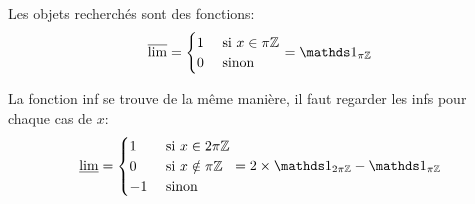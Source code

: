 {\begin{nntd-sol}[]
\begin{enumerate}
            Les objets recherchés sont des fonctions:
            \begin{equation*}
                \lims = \begin{cases}
                    1&\text{ si }x\in\pi\Z\\
                    0&\text{ sinon}
                \end{cases} = \one_{\pi\Z}
            \end{equation*}

            La fonction inf se trouve de la même manière, il faut regarder les infs pour chaque cas de \(x\):
            \begin{equation*}
                \limi = \begin{cases}
                    1&\text{ si }x\in2\pi\Z\\
                    0&\text{ si }x\notin\pi\Z\\
                    -1&\text{ sinon}
                \end{cases} = 2\times\one_{2\pi\Z} - \one_{\pi\Z}
            \end{equation*}

        \end{enumerate}
    \end{nntd-sol}
}{}

